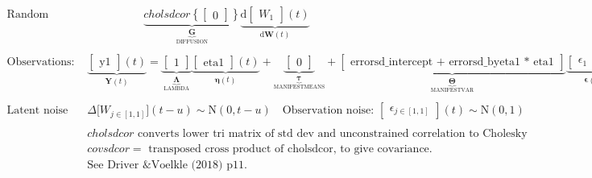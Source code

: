 \documentclass[a4paper]{article}
\newcommand{\vect}[1]{\boldsymbol{\mathbf{#1}}}
\begin{document}
\begin{footnotesize}
\begin{align*}
    \textrm{Random change: }
    & \qquad \qquad \quad \underbrace{cholsdcor\left\{
      \begin{bmatrix}
0
\end{bmatrix}\right\}
    }_{\underbrace{\vect{G}}_\textrm{DIFFUSION}}
    \underbrace{\mathrm{d}
      \begin{bmatrix}
W_{1}
\end{bmatrix} 
      (t)}_{\mathrm{d} \vect{W}(t)} \\ \\
              \textrm{Observations: }
&\underbrace{
      \begin{bmatrix}
\text{y1}
\end{bmatrix}  
      (t)}_{\vect{Y}(t)} = 
        \underbrace{
          \begin{bmatrix}
1
\end{bmatrix} 
        }_{\underbrace{\vect{\Lambda}}_\textrm{LAMBDA}} \underbrace{
          \begin{bmatrix}
\text{eta1}
\end{bmatrix} 
          (t)}_{\vect{\eta}(t)} +
        \underbrace{
          \begin{bmatrix}
0
\end{bmatrix} 
        }_{\underbrace{\vect{\tau}}_\textrm{MANIFESTMEANS}} + 
              \underbrace{
                \begin{bmatrix}
\text{errorsd\_intercept + errorsd\_byeta1 * eta1}
\end{bmatrix}  
              }_{\underbrace{\vect{\Theta}}_\textrm{MANIFESTVAR}}
              \underbrace{
          \begin{bmatrix}
\epsilon_{1}
\end{bmatrix} 
          (t)}_{\vect{\epsilon}(t)} \\ \\
                \textrm{Latent noise per time step : }
          &\Delta \big[W_{j \in [1,1]}\big](t-u)   \sim  \mathrm{N}(0,t-u) \quad
              \textrm{Observation noise: }
            \begin{bmatrix}
\epsilon_{j \in [1,1]}
\end{bmatrix} 
            (t) \sim  \mathrm{N}(0,1) \\ \\
&cholsdcor\textrm{ converts lower tri matrix of std dev and unconstrained correlation to Cholesky factor covariance.} \\
&covsdcor =\textrm{ transposed cross product of cholsdcor, to give covariance.} \\
&\textrm{See Driver \& Voelkle (2018) p11.}
      \end{align*}
      \end{footnotesize}
      
\end{document}
